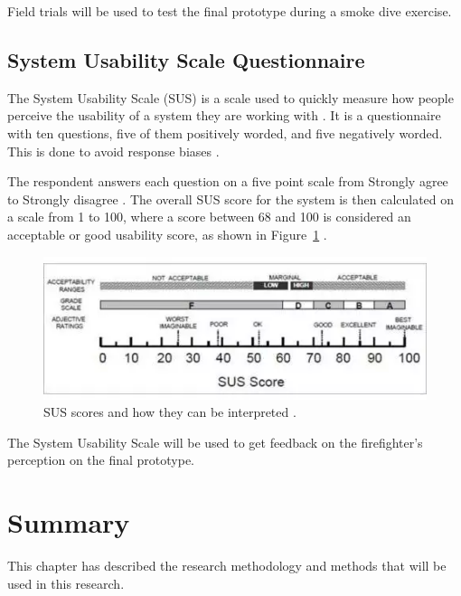 \documentclass[../Main/thesis.tex]{subfiles}
\begin{document}
Field trials will be used to test the final prototype during a smoke dive exercise.

\subsection{System Usability Scale Questionnaire}
The System Usability Scale (SUS) is a scale used to quickly measure how people perceive the usability of a system they are working with \citep{Brooke2013}.
It is a questionnaire with ten questions, five of them positively worded, and five negatively worded.
This is done to avoid response biases \citep{Brooke2013}.

The respondent answers each question on a five point scale from Strongly agree to Strongly disagree \citep{AssistantSecretaryforPublicAffairs2013}.
The overall SUS score for the system is then calculated on a scale from 1 to 100, where a score between 68 and 100 is considered an acceptable or good usability score, as shown in Figure~\ref{fig:sus-score} \citep{AssistantSecretaryforPublicAffairs2013}.

\begin{figure}[h]
	\centering
	\includegraphics[width=\textwidth]{../fig/sus-score}
	\caption[SUS scores and how they can be interpreted]{SUS scores and how they can be interpreted \citep[p. 36]{Brooke2013}.}
	\label{fig:sus-score}
\end{figure}

The System Usability Scale will be used to get feedback on the firefighter's perception on the final prototype.


\section{Summary}
This chapter has described the research methodology and methods that will be used in this research. 

\blankpage


\onlyinsubfile{}
\onlyinsubfile{}
\end{document}
